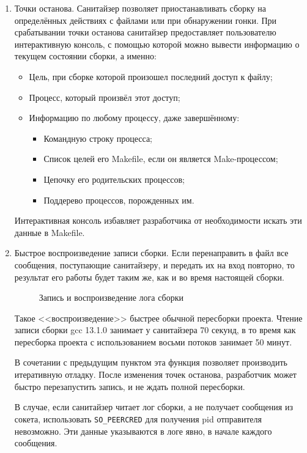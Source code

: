 \begin{enumerate}
    \item Точки останова. Санитайзер позволяет приостанавливать сборку на определённых действиях с файлами или при обнаружении гонки. При срабатывании точки останова санитайзер предоставляет пользователю интерактивную консоль, с помощью которой можно вывести информацию о текущем состоянии сборки, а именно:

    \begin{itemize}
        \item Цель, при сборке которой произошел последний доступ к файлу;
        \item Процесс, который произвёл этот доступ;
        \item Информацию по любому процессу, даже завершённому:
        \begin{itemize}
            \item Командную строку процесса;
            \item Список целей его Makefile, если он является Make-процессом;
            \item Цепочку его родительских процессов;
            \item Поддерево процессов, порожденных им.
        \end{itemize}
    \end{itemize}

    Интерактивная консоль избавляет разработчика от необходимости искать эти данные в Makefile.

    \item Быстрое воспроизведение записи сборки. Если перенаправить в файл все сообщения, поступающие санитайзеру, и передать их на вход повторно, то результат его работы будет таким же, как и во время настоящей сборки.

    \begin{figure}[H]
        \centering
        
        \caption{Запись и воспроизведение лога сборки}
        \label{fig:build-dumping}
    \end{figure}

    Такое <<воспроизведение>> быстрее обычной пересборки проекта. Чтение записи сборки gcc 13.1.0 занимает у санитайзера 70 секунд, в то время как пересборка проекта с использованием восьми потоков занимает 50 минут.

    В сочетании с предыдущим пунктом эта функция позволяет производить итеративную отладку. После изменения точек останова, разработчик может быстро перезапустить запись, и не ждать полной пересборки.

    В случае, если санитайзер читает лог сборки, а не получает сообщения из сокета, использовать \texttt{SO\_PEERCRED} для получения pid отправителя невозможно. Эти данные указываются в логе явно, в начале каждого сообщения.
\end{enumerate}

